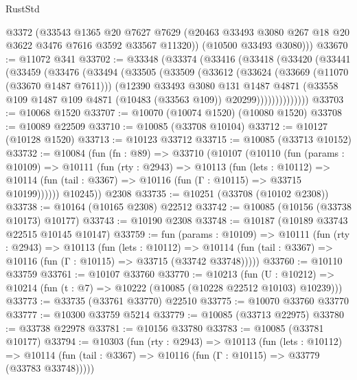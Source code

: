 \begin{lexlean}{RustStd}
\begin{coremodule}
        @3372
        (@33543
          @1365
          @20
          @7627
          @7629
          (@20463 @33493 @3080 @267 @18 @20 @3622 @3476 @7616 @3592 @33567 @11320))
        (@10500 @33493 @3080)))
@33670 := @11072 @341
@33702 := @33348
    (@33374
      (@33416
        (@33418
          (@33420
            (@33441
              (@33459
                (@33476
                  (@33494
                    (@33505
                      (@33509
                        (@33612
                          (@33624
                            (@33669 (@11070 (@33670 @1487 @7611)))
                            (@12390
                              @33493
                              @3080
                              @131
                              @1487
                              @4871
                              (@33558
                                @109
                                @1487
                                @109
                                @4871
                                (@10483 (@33563 @109))
                                @20299))))))))))))))
@33703 := @10068 @1520
@33707 := @10070 (@10074 @1520) (@10080 @1520)
@33708 := @10089 @22509
@33710 := @10085 (@33708 @10104)
@33712 := @10127 (@10128 @1520)
@33713 := @10123 @33712
@33715 := @10085 (@33713 @10152)
@33732 := @10084
    (fun (fn : @89) =>
    @33710
      (@10107
        (@10110
          (fun (params : @10109) =>
          @10111
            (fun (rty : @2943) =>
            @10113
              (fun (lets : @10112) =>
              @10114 (fun (tail : @3367) => @10116 (fun (Γ : @10115) => @33715 @10199))))))
        @10245))
    @2308
@33735 := @10251 (@33708 (@10102 @2308))
@33738 := @10164 (@10165 @2308) @22512
@33742 := @10085 (@10156 (@33738 @10173) @10177)
@33743 := @10190 @2308
@33748 := @10187 (@10189 @33743 @22515 @10145 @10147)
@33759 := fun (params : @10109) =>
  @10111
    (fun (rty : @2943) =>
    @10113
      (fun (lets : @10112) =>
      @10114 (fun (tail : @3367) => @10116 (fun (Γ : @10115) => @33715 (@33742 @33748)))))
@33760 := @10110 @33759
@33761 := @10107 @33760
@33770 := @10213
    (fun (U : @10212) => @10214 (fun (t : @7) => @10222 (@10085 (@10228 @22512 @10103) @10239)))
@33773 := @33735 (@33761 @33770) @22510
@33775 := @10070 @33760 @33770
@33777 := @10300 @33759 @5214
@33779 := @10085 (@33713 @22975)
@33780 := @33738 @22978
@33781 := @10156 @33780
@33783 := @10085 (@33781 @10177)
@33794 := @10303
    (fun (rty : @2943) =>
    @10113
      (fun (lets : @10112) =>
      @10114 (fun (tail : @3367) => @10116 (fun (Γ : @10115) => @33779 (@33783 @33748)))))

\end{coremodule}
\end{lexlean}
